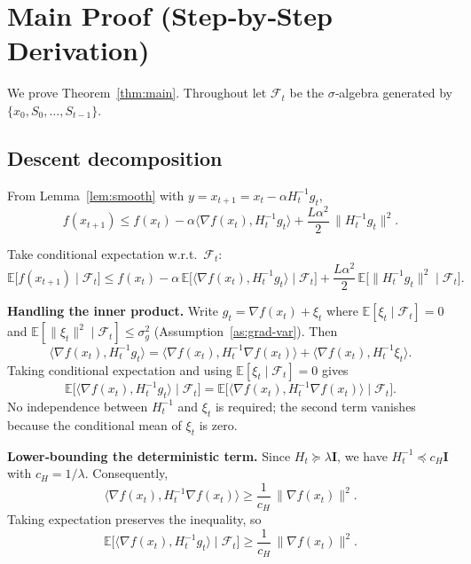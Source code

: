 \documentclass{article}
\newcommand{\E}{\mathbb{E}}
\newcommand{\ip}[2]{\langle #1,#2\rangle}
\newcommand{\Id}{\mathbf I}
\begin{document}
\section*{Main Proof (Step‑by‑Step Derivation)}
We prove Theorem~\ref{thm:main}. Throughout let $\mathcal{F}_t$ be the $\sigma$‑algebra generated by $\{x_0,S_0,\dots,S_{t-1}\}$.

\subsection*{Descent decomposition}
\begin{enumerate}[label={[\arabic*]}]
\item From Lemma~\ref{lem:smooth} with $y=x_{t+1}=x_t-\alpha H_t^{-1}g_t$,
\[
f(x_{t+1})\le f(x_t)-\alpha\ip{\nabla f(x_t)}{H_t^{-1}g_t}
       +\frac{L\alpha^{2}}{2}\,\|H_t^{-1}g_t\|^{2}.
\tag{5}
\]
\item Take conditional expectation w.r.t.\ $\mathcal{F}_t$:
\[
\E\!\big[f(x_{t+1})\mid\mathcal{F}_t\big]
\le f(x_t)-\alpha\,\E\!\big[\ip{\nabla f(x_t)}{H_t^{-1}g_t}\mid\mathcal{F}_t\big]
   +\frac{L\alpha^{2}}{2}\,\E\!\big[\|H_t^{-1}g_t\|^{2}\mid\mathcal{F}_t\big].
\tag{6}
\]

\item \textbf{Handling the inner product.}  
Write $g_t=\nabla f(x_t)+\xi_t$ where $\E[\xi_t\mid\mathcal{F}_t]=0$ and
$\E[\|\xi_t\|^{2}\mid\mathcal{F}_t]\le\sigma_g^{2}$ (Assumption~\ref{as:grad-var}).
Then
\[
\ip{\nabla f(x_t)}{H_t^{-1}g_t}
 =\ip{\nabla f(x_t)}{H_t^{-1}\nabla f(x_t)}
   +\ip{\nabla f(x_t)}{H_t^{-1}\xi_t}.
\tag{7}
\]
Taking conditional expectation and using $\E[\xi_t\mid\mathcal{F}_t]=0$ gives
\[
\E\!\big[\ip{\nabla f(x_t)}{H_t^{-1}g_t}\mid\mathcal{F}_t\big]
 =\E\!\big[\ip{\nabla f(x_t)}{H_t^{-1}\nabla f(x_t)}\mid\mathcal{F}_t\big].
\tag{8}
\]
No independence between $H_t^{-1}$ and $\xi_t$ is required; the second term vanishes because the
conditional mean of $\xi_t$ is zero.

\item \textbf{Lower‑bounding the deterministic term.}  
Since $H_t\succeq\lambda\Id$, we have $H_t^{-1}\preceq c_H\Id$ with $c_H=1/\lambda$.
Consequently,
\[
\ip{\nabla f(x_t)}{H_t^{-1}\nabla f(x_t)}
 \ge \frac1{c_H}\,\|\nabla f(x_t)\|^{2}.
\tag{9}
\]
Taking expectation preserves the inequality, so
\[
\E\!\big[\ip{\nabla f(x_t)}{H_t^{-1}g_t}\mid\mathcal{F}_t\big]
 \ge \frac1{c_H}\,\|\nabla f(x_t)\|^{2}.
\tag{10}
\]


\end{enumerate}
\end{document}
